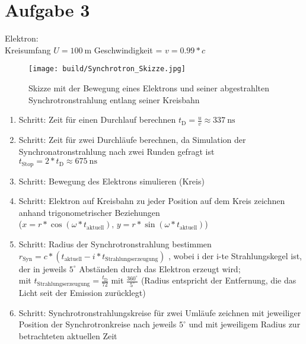\documentclass[11pt,a4paper]{article}
\begin{document}
    \section*{Aufgabe 3}
        Elektron: \\
            Kreisumfang \(U = \SI{100}{\metre}\)
            Geschwindigkeit = \( v = 0.99*c \)
        \begin{figure}[h]
            \centering
            \texttt{[image: build/Synchrotron\_Skizze.jpg]}
            \caption{Skizze mit der Bewegung eines Elektrons und seiner abgestrahlten Synchrotronstrahlung entlang seiner Kreisbahn}
        \end{figure}
        \begin{enumerate}
            \item Schritt: Zeit für einen Durchlauf berechnen \( t_{\mathrm{D}} = \frac{u}{v} \approx \SI{337}{\nano\second}\) 
            \item Schritt: Zeit für zwei Durchläufe berechnen, da Simulation der Synchronatronstrahlung nach zwei Runden gefragt ist \\
            \( t_{\mathrm{Stop}} = 2*t_{\mathrm{D}} \approx \SI{675}{\nano\second}\) 
            \item Schritt: Bewegung des Elektrons simulieren (Kreis)
            \item Schritt: Elektron auf Kreisbahn zu jeder Position auf dem Kreis zeichnen anhand trigonometrischer Beziehungen \\
            (\( x = r * \cos(\omega * t_{ \mathrm{aktuell} } ) , \, y = r * \sin(\omega * t_{ \mathrm{aktuell} } ) \))
            \item Schritt: Radius der Synchrotronstrahlung bestimmen \\
            \( r_{\mathrm{Syn}} = c*(t_{ \mathrm{aktuell} } - i * t_{ \mathrm{Strahlungserzeugung} } ) \) , 
            wobei i der i-te Strahlungskegel ist, der in jeweils \( 5 ^\circ\) Abständen durch das Elektron erzeugt wird; \\
            mit \( t_{\mathrm{Strahlungserzeugung}} = \frac{t_{\mathrm{D}}}{72} \) mit \( \frac{360 ^\circ}{5 ^\circ} \) 
            (Radius entspricht der Entfernung, die das Licht seit der Emission zurücklegt)
            \item Schritt: Synchrotronstrahlungskreise für zwei Umläufe zeichnen mit jeweiliger Position der Synchrotronkreise 
            nach jeweils \( 5 ^\circ\) und mit jeweiligem Radius zur betrachteten aktuellen Zeit 
        \end{enumerate}
\end{document}
